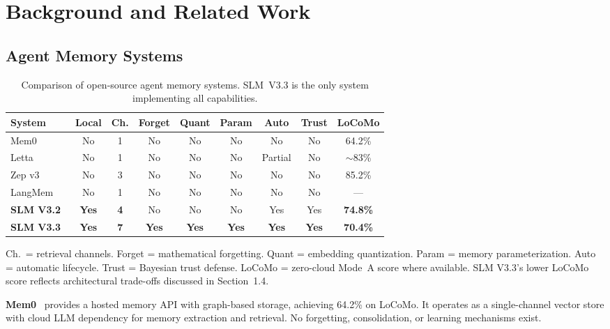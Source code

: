 \section{Background and Related Work}
\label{sec:related}

\subsection{Agent Memory Systems}

\begin{table}[h]
\centering
\caption{Comparison of open-source agent memory systems. SLM~V3.3 is the only system implementing all capabilities.}
\label{tab:memory-systems}
\small
\begin{tabular}{lcccccccc}
\toprule
\textbf{System} & \textbf{Local} & \textbf{Ch.} & \textbf{Forget} & \textbf{Quant} & \textbf{Param} & \textbf{Auto} & \textbf{Trust} & \textbf{LoCoMo} \\
\midrule
Mem0~\cite{mem0} & No & 1 & No & No & No & No & No & 64.2\% \\
Letta~\cite{letta} & No & 1 & No & No & No & Partial & No & $\sim$83\% \\
Zep v3 & No & 3 & No & No & No & No & No & 85.2\% \\
LangMem & No & 1 & No & No & No & No & No & --- \\
\midrule
\textbf{SLM V3.2}~\cite{slm-paper2} & \textbf{Yes} & \textbf{4} & No & No & No & Yes & Yes & \textbf{74.8\%} \\
\textbf{SLM V3.3} & \textbf{Yes} & \textbf{7} & \textbf{Yes} & \textbf{Yes} & \textbf{Yes} & \textbf{Yes} & \textbf{Yes} & \textbf{70.4\%} \\
\bottomrule
\end{tabular}
\vspace{2pt}
{\footnotesize Ch.\ = retrieval channels. Forget = mathematical forgetting. Quant = embedding quantization. Param = memory parameterization. Auto = automatic lifecycle. Trust = Bayesian trust defense. LoCoMo = zero-cloud Mode~A score where available. SLM V3.3's lower LoCoMo score reflects architectural trade-offs discussed in Section~1.4.}
\end{table}

\textbf{Mem0}~\cite{mem0} provides a hosted memory API with graph-based storage, achieving 64.2\% on LoCoMo. It operates as a single-channel vector store with cloud LLM dependency for memory extraction and retrieval. No forgetting, consolidation, or learning mechanisms exist.

